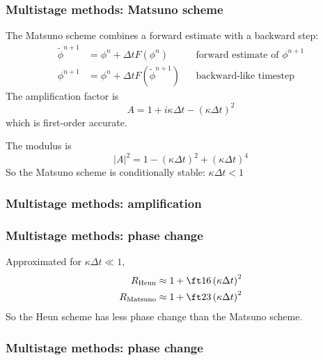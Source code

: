 \documentclass[aspectratio=43,9pt]{beamer}
\begin{document}
%
%
\begin{frame}
	\frametitle{Multistage methods: Matsuno scheme}
	The Matsuno scheme combines a forward estimate with a backward step:
	\begin{align*}
		\tilde \phi^{n+1}&=\phi^n+\Delta t F(\phi^n)	&& \text{forward estimate of }\phi^{n+1}	\\
		\phi^{n+1}&=\phi^n+\Delta t F(\tilde \phi^{n+1}) &&\text{backward-like timestep}
	\end{align*}
	The amplification factor is
	\begin{equation*}
		A=1+i\kappa\Delta t-(\kappa\Delta t)^2
	\end{equation*}
	which is first-order accurate.
	\par\vspace*{2ex}
	The modulus is
	\begin{equation*}
		|A|^2=1 - \left(\kappa \Delta t \right)^2+ \left(\kappa \Delta t \right)^4
	\end{equation*}
	So the Matsuno scheme is conditionally stable: $\kappa\Delta t<1$
\end{frame}
%
%
%
\begin{frame}
	\frametitle{Multistage methods: amplification}
%
\footnotesize
%
\begin{center}
	\scalebox{.95}{}
\end{center}
%
\end{frame}
%
%
%
\begin{frame}
	\frametitle{Multistage methods: phase change}
	Approximated for $\kappa \Delta t\ll 1$,
	\begin{align*}
		R_\text{Heun} &\approx 1 + \ft16 \left(\kappa \Delta t\right)^2 \\
		R_\text{Matsuno} &\approx 1 + \ft23 \left(\kappa \Delta t \right)^2
	\end{align*}
	So the Heun scheme has less phase change than the Matsuno scheme.
\end{frame}
%
%
%
\begin{frame}
	\frametitle{Multistage methods: phase change}
\footnotesize
%
\begin{center}
	\scalebox{.95}{}
\end{center}
%
\end{frame}
\end{document}
